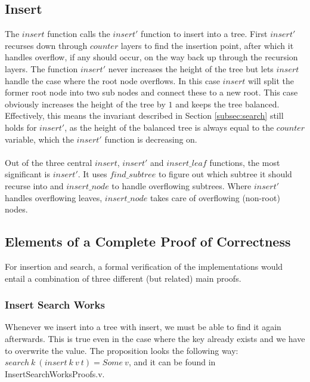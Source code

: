 \subsection{Insert}
The $insert$ function calls the $insert'$ function to insert into a tree. First $insert'$ recurses down through $counter$ layers to find the insertion point, after which it handles overflow, if any should occur, on the way back up through the recursion layers. The function $insert'$ never increases the height of the tree but lets $insert$ handle the case where the root node overflows. In this case $insert$ will split the former root node into two sub nodes and connect these to a new root. This case obviously increases the height of the tree by $1$ and keeps the tree balanced. Effectively, this means the invariant described in Section \ref{subsec:search} still holds for $insert'$, as the height of the balanced tree is always equal to the $counter$ variable, which the $insert'$ function is decreasing on.

\paragraph{}
Out of the three central $insert$, $insert'$ and $insert\_leaf$ functions, the most significant is $insert'$. It uses $find\_subtree$ to figure out which subtree it should recurse into and $insert\_node$ to handle overflowing subtrees. Where $insert'$ handles overflowing leaves, $insert\_node$ takes care of overflowing (non-root) nodes.

\subsection{Elements of a Complete Proof of Correctness}
\label{sec:ElementsOfACompleteProof}
For insertion and search, a formal verification of the implementations would entail a combination of three different (but related) main proofs.

\subsubsection{Insert Search Works}
Whenever we insert into a tree with insert, we must be able to find it again afterwards. This is true even in the case where the key already exists and we have to overwrite the value. The proposition looks the following way: $search\ k\ (insert\ k\ v\ t) = Some\ v$, and it can be found in InsertSearchWorksProofs.v.

